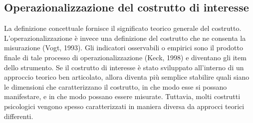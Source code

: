 \subsection{Operazionalizzazione del costrutto di interesse}

La definizione concettuale fornisce il significato teorico generale del costrutto. L'operazionalizzazione è invece una definizione del costrutto che ne consenta la misurazione (Vogt, 1993). Gli indicatori osservabili o empirici sono il prodotto finale di tale processo di operazionalizzazione (Keck, 1998) e diventano gli item dello strumento. Se il costrutto di interesse è stato sviluppato all'interno di un approccio teorico ben articolato, allora diventa più semplice stabilire quali siano le dimensioni che caratterizzano il costrutto, in che modo esse si possano manifestare, e in che modo possano essere misurate. Tuttavia, molti costrutti psicologici vengono spesso caratterizzati in maniera diversa da approcci teorici differenti. 

